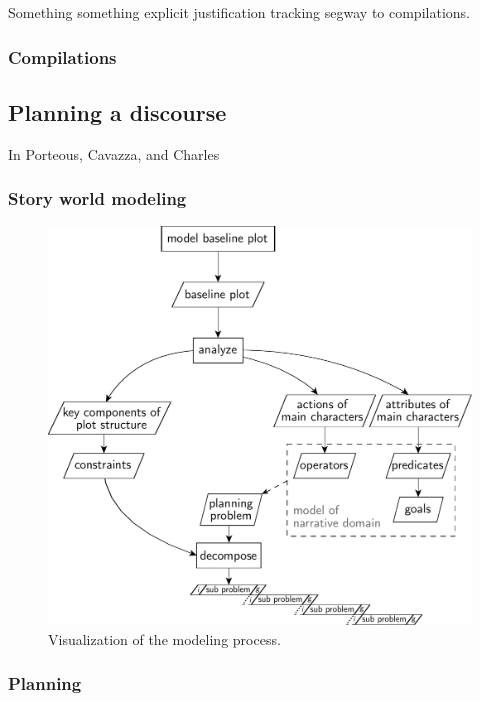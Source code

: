 Something something explicit justification tracking segway to compilations.

\subsubsection{Compilations}
\subsection{Planning a discourse}\label{discourse}
In \cite{Porteous10} Porteous, Cavazza, and Charles
\subsubsection{Story world modeling}
\begin{figure}[htbp]
 \centering
 \includegraphics[scale=0.6]{discourse_model}
 \caption{Visualization of the modeling process.}
 \label{fig:intplan}
\end{figure}
\subsubsection{Planning}
